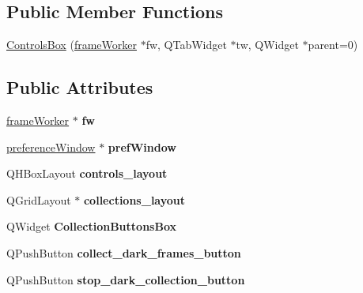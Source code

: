\subsection*{Public Member Functions}
\begin{DoxyCompactItemize}
\item 
\hyperlink{classControlsBox_aa477862b3fc7916f8cc0b8d401dba638}{Controls\+Box} (\hyperlink{classframeWorker}{frame\+Worker} $\ast$fw, Q\+Tab\+Widget $\ast$tw, Q\+Widget $\ast$parent=0)
\end{DoxyCompactItemize}
\subsection*{Public Attributes}
\begin{DoxyCompactItemize}
\item 
\hypertarget{classControlsBox_ad27bdf2d268ef8b6204a12b703095a38}{\hyperlink{classframeWorker}{frame\+Worker} $\ast$ {\bfseries fw}}\label{classControlsBox_ad27bdf2d268ef8b6204a12b703095a38}

\item 
\hypertarget{classControlsBox_af847d7f91b0ca524eb5ab9a1847d5ab1}{\hyperlink{classpreferenceWindow}{preference\+Window} $\ast$ {\bfseries pref\+Window}}\label{classControlsBox_af847d7f91b0ca524eb5ab9a1847d5ab1}

\item 
\hypertarget{classControlsBox_a7734cbb7dab018ee1eb9af7da2c25f4b}{Q\+H\+Box\+Layout {\bfseries controls\+\_\+layout}}\label{classControlsBox_a7734cbb7dab018ee1eb9af7da2c25f4b}

\item 
\hypertarget{classControlsBox_ad34d036a227162d2cbb7979e80c3cc47}{Q\+Grid\+Layout $\ast$ {\bfseries collections\+\_\+layout}}\label{classControlsBox_ad34d036a227162d2cbb7979e80c3cc47}

\item 
\hypertarget{classControlsBox_a9056502f261b7c11bd45c2b795bf0806}{Q\+Widget {\bfseries Collection\+Buttons\+Box}}\label{classControlsBox_a9056502f261b7c11bd45c2b795bf0806}

\item 
\hypertarget{classControlsBox_a732c5c469e545c513a74f286a9711799}{Q\+Push\+Button {\bfseries collect\+\_\+dark\+\_\+frames\+\_\+button}}\label{classControlsBox_a732c5c469e545c513a74f286a9711799}

\item 
\hypertarget{classControlsBox_aaac7cb93bf092ecaca7a3c3b4edb9660}{Q\+Push\+Button {\bfseries stop\+\_\+dark\+\_\+collection\+\_\+button}}\label{classControlsBox_aaac7cb93bf092ecaca7a3c3b4edb9660}


\end{DoxyCompactItemize}
